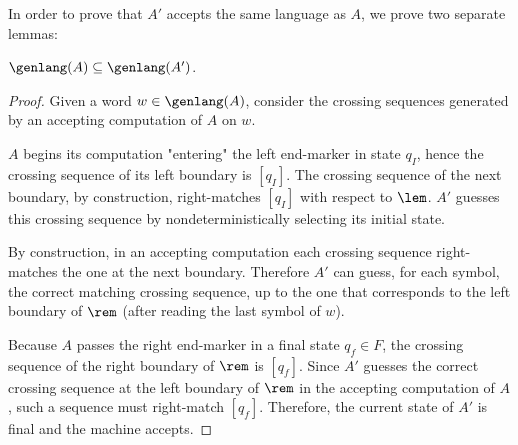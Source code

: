 In order to prove that $A'$ accepts the same language as $A$, we prove two separate lemmas:
\begin{lemm}\label{lem:2DFAto1NFA-1}
	$\genlang(A)\subseteq\genlang(A')$.
\end{lemm}
\begin{proof}
	Given a word $w\in\genlang(A)$, consider the crossing sequences generated by an accepting computation of $A$ on $w$.

	$A$ begins its computation "entering" the left end-marker in state $q_I$, hence the crossing sequence of its left boundary is $[q_I]$.
	The crossing sequence of the next boundary, by construction, right-matches $[q_I]$ with respect to $\lem$.
	$A'$ guesses this crossing sequence by nondeterministically selecting its initial state.

	By construction, in an accepting computation each crossing sequence right-matches the one at the next boundary.
	Therefore $A'$ can guess, for each symbol, the correct matching crossing sequence, up to the one that corresponds to the left boundary of $\rem$ (after reading the last symbol of $w$).

	Because $A$ passes the right end-marker in a final state $q_f\in F$, the crossing sequence of the right boundary of $\rem$ is $[q_f]$.
	Since $A'$ guesses the correct crossing sequence at the left boundary of $\rem$ in the accepting computation of $A$, such a sequence must right-match $[q_f]$.
	Therefore, the current state of $A'$ is final and the machine accepts.
\end{proof}


